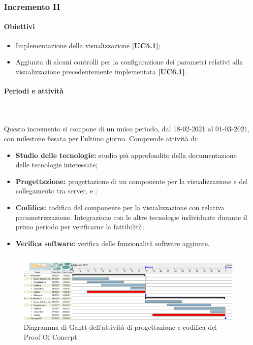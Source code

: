 \subsubsection{Incremento II}  
\paragraph{Obiettivi}
\begin{itemize}
\item Implementazione della visualizzazione  \textbf{[UC5.1]};
\item Aggiunta di alcuni controlli per la configurazione dei parametri relativi alla visualizzazione precedentemente implementata  \textbf{[UC6.1]}. 
\end{itemize}			
	
\paragraph{Periodi e attività} \mbox{}\\\mbox{}\\
Questo incremento si compone di un unico periodo, dal 18-02-2021 al 01-03-2021, con milestone fissata per l'ultimo giorno. Comprende attività di:
\begin{itemize}
\item \textbf{Studio delle tecnologie:} studio più approfondito della documentazione delle tecnologie interessate;
\item \textbf{Progettazione:} progettazione di un componente per la visualizzazione  e del collegamento tra server,  e ;
\item \textbf{Codifica:} codifica del componente per la visualizzazione con relativa parametrizzazione. Integrazione con le altre tecnologie individuate durante il primo periodo per verificarne la fattibilità;
\item \textbf{Verifica software:} verifica delle funzionalità software aggiunte.
\end{itemize}

\begin{figure}[h]
	\centering	
	\includegraphics[width=\linewidth]{Images/GanttPianificazioneProgettazionePoc.PNG}
	\caption{Diagramma di Gantt dell'attività di progettazione e codifica del Proof Of Concept}
\end{figure}




